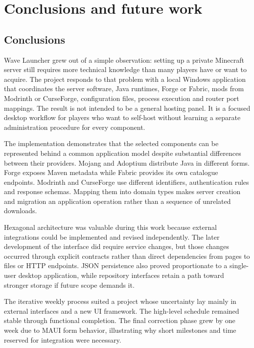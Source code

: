 
\chapter{Conclusions and future work}\label{chap:conclusions}

\section{Conclusions}

Wave Launcher grew out of a simple observation: setting up a private Minecraft server still requires more technical knowledge than many players have or want to acquire. The project responds to that problem with a local Windows application that coordinates the server software, Java runtimes, Forge or Fabric, mods from Modrinth or CurseForge, configuration files, process execution and router port mappings. The result is not intended to be a general hosting panel. It is a focused desktop workflow for players who want to self-host without learning a separate administration procedure for every component.

The implementation demonstrates that the selected components can be represented behind a common application model despite substantial differences between their providers. Mojang and Adoptium distribute Java in different forms. Forge exposes Maven metadata while Fabric provides its own catalogue endpoints. Modrinth and CurseForge use different identifiers, authentication rules and response schemas. Mapping them into domain types makes server creation and migration an application operation rather than a sequence of unrelated downloads.

Hexagonal architecture was valuable during this work because external integrations could be implemented and revised independently. The later development of the interface did require service changes, but those changes occurred through explicit contracts rather than direct dependencies from pages to files or HTTP endpoints. JSON persistence also proved proportionate to a single-user desktop application, while repository interfaces retain a path toward stronger storage if future scope demands it.

The iterative weekly process suited a project whose uncertainty lay mainly in external interfaces and a new UI framework. The high-level schedule remained stable through functional completion. The final correction phase grew by one week due to MAUI form behavior, illustrating why short milestones and time reserved for integration were necessary.

